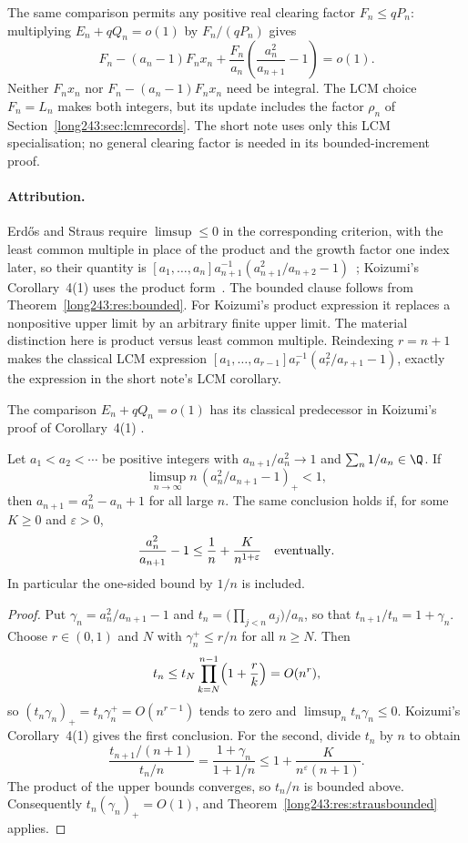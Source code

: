The same comparison permits any positive real clearing factor
$F_n\le qP_n$: multiplying $E_n+qQ_n=o(1)$ by $F_n/(qP_n)$ gives
\[
 F_n-(a_n-1)F_nx_n+
 \frac{F_n}{a_n}\left(\frac{a_n^2}{a_{n+1}}-1\right)=o(1).
\]
Neither $F_nx_n$ nor $F_n-(a_n-1)F_nx_n$ need be integral. The LCM
choice $F_n=L_n$ makes both integers, but its update includes the
factor $\rho_n$ of Section~\ref{long243:sec:lcmrecords}. The short note
uses only this LCM specialisation; no general clearing factor is
needed in its bounded-increment proof.

\paragraph{Attribution.}
Erd\H{o}s and Straus require $\limsup\le0$ in the corresponding criterion, with
the least common multiple in place of the product and the growth factor one
index later, so their quantity is
$[a_1,\ldots,a_n]a_{n+1}^{-1}(a_{n+1}^{2}/a_{n+2}-1)$~\cite[Theorem~3,
p.~132]{erdosstraus1964}; Koizumi's Corollary~4(1) uses the product
form~\cite[Cor.~4(1), pp.~14--15]{koizumi2025}.  The bounded clause follows from
Theorem~\ref{long243:res:bounded}. For Koizumi's product expression it
replaces a nonpositive upper limit by an arbitrary finite upper limit.
The material distinction here is product versus least common multiple.
Reindexing $r=n+1$ makes the classical LCM expression
$[a_1,\ldots,a_{r-1}]a_r^{-1}(a_r^2/a_{r+1}-1)$, exactly the expression
in the short note's LCM corollary.

The comparison $E_n+qQ_n=o(1)$ has its classical predecessor in
Koizumi's proof of Corollary~4(1) \cite[(11)--(12), p.~15]{koizumi2025}.

\begin{corollary}\label{long243:res:onethreshold}
Let $a_1<a_2<\cdots$ be positive integers with $a_{n+1}/a_n^2\to1$
and $\sum_n1/a_n\in\Q$. If
\[
 \limsup_{n\to\infty} n\,(a_n^2/a_{n+1}-1)_+<1,
\]
then $a_{n+1}=a_n^2-a_n+1$ for all large $n$. The same conclusion holds if, for some $K\ge0$ and $\varepsilon>0$,
\[
 \frac{a_n^2}{a_{n+1}}-1\le\frac1n+\frac{K}{n^{1+\varepsilon}}
 \quad\hbox{eventually}.
\]
In particular the one-sided bound by $1/n$ is included.
\end{corollary}

\begin{proof}
Put $\gamma_n=a_n^2/a_{n+1}-1$ and $t_n=\bigl(\prod_{j<n}a_j\bigr)/a_n$, so
that $t_{n+1}/t_n=1+\gamma_n$.  Choose $r\in(0,1)$ and $N$ with
$\gamma_n^{+}\le r/n$ for all $n\ge N$.  Then
\[
 t_n\le t_N\prod_{k=N}^{n-1}\Bigl(1+\frac rk\Bigr)=O(n^{r}),
\]
so $(t_n\gamma_n)_+=t_n\gamma_n^{+}=O(n^{r-1})$ tends to zero and
$\limsup_nt_n\gamma_n\le0$.  Koizumi's Corollary~4(1)
\cite[pp.~14--15]{koizumi2025} gives the first conclusion.
For the second, divide $t_n$ by $n$ to obtain
\[
 \frac{t_{n+1}/(n+1)}{t_n/n}
 =\frac{1+\gamma_n}{1+1/n}
 \le 1+\frac{K}{n^\varepsilon(n+1)}.
\]
The product of the upper bounds converges, so $t_n/n$ is bounded above.
Consequently $t_n(\gamma_n)_+=O(1)$, and
Theorem~\ref{long243:res:strausbounded} applies.
\end{proof}

